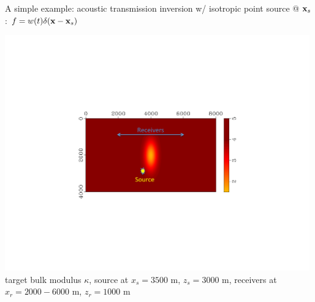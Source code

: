 \documentclass[xcolor=dvipsnames,12pt,aspectratio=169]{beamer}
\begin{document}
\begin{frame}
A simple example: acoustic transmission inversion w/ isotropic point source @ $\mathbf{x}_s$: $f = w(t)\delta(\mathbf{x}-\mathbf{x}_s)$
\vspace{-1.25in}
\begin{center}
\hspace{-0.5in}\includegraphics[height=4.0in]{Fig/bml0c.pdf}\\
\vspace{-1in}
target bulk modulus $\kappa$, source at $x_s=3500$ m, $z_s=3000$ m, receivers at $x_r=2000-6000$ m, $z_r=1000$ m
\end{center}
\end{frame}
\end{document}
